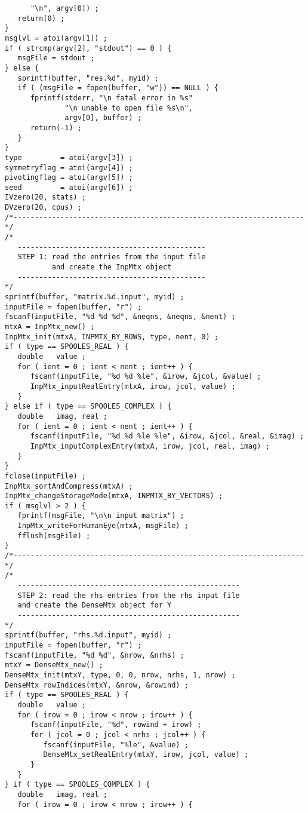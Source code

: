 \begin{verbatim}
      "\n", argv[0]) ;
   return(0) ;
}
msglvl = atoi(argv[1]) ;
if ( strcmp(argv[2], "stdout") == 0 ) {
   msgFile = stdout ;
} else {
   sprintf(buffer, "res.%d", myid) ;
   if ( (msgFile = fopen(buffer, "w")) == NULL ) {
      fprintf(stderr, "\n fatal error in %s"
              "\n unable to open file %s\n",
              argv[0], buffer) ;
      return(-1) ;
   }
}
type         = atoi(argv[3]) ;
symmetryflag = atoi(argv[4]) ;
pivotingflag = atoi(argv[5]) ;
seed         = atoi(argv[6]) ;
IVzero(20, stats) ;
DVzero(20, cpus) ;
/*--------------------------------------------------------------------*/
/*
   --------------------------------------------
   STEP 1: read the entries from the input file 
           and create the InpMtx object
   --------------------------------------------
*/
sprintf(buffer, "matrix.%d.input", myid) ;
inputFile = fopen(buffer, "r") ;
fscanf(inputFile, "%d %d %d", &neqns, &neqns, &nent) ;
mtxA = InpMtx_new() ;
InpMtx_init(mtxA, INPMTX_BY_ROWS, type, nent, 0) ;
if ( type == SPOOLES_REAL ) {
   double   value ;
   for ( ient = 0 ; ient < nent ; ient++ ) {
      fscanf(inputFile, "%d %d %le", &irow, &jcol, &value) ;
      InpMtx_inputRealEntry(mtxA, irow, jcol, value) ;
   }
} else if ( type == SPOOLES_COMPLEX ) {
   double   imag, real ;
   for ( ient = 0 ; ient < nent ; ient++ ) {
      fscanf(inputFile, "%d %d %le %le", &irow, &jcol, &real, &imag) ;
      InpMtx_inputComplexEntry(mtxA, irow, jcol, real, imag) ;
   }
}
fclose(inputFile) ;
InpMtx_sortAndCompress(mtxA) ;
InpMtx_changeStorageMode(mtxA, INPMTX_BY_VECTORS) ;
if ( msglvl > 2 ) {
   fprintf(msgFile, "\n\n input matrix") ;
   InpMtx_writeForHumanEye(mtxA, msgFile) ;
   fflush(msgFile) ;
}
/*--------------------------------------------------------------------*/
/*
   ----------------------------------------------------
   STEP 2: read the rhs entries from the rhs input file 
   and create the DenseMtx object for Y
   ----------------------------------------------------
*/
sprintf(buffer, "rhs.%d.input", myid) ;
inputFile = fopen(buffer, "r") ;
fscanf(inputFile, "%d %d", &nrow, &nrhs) ;
mtxY = DenseMtx_new() ;
DenseMtx_init(mtxY, type, 0, 0, nrow, nrhs, 1, nrow) ;
DenseMtx_rowIndices(mtxY, &nrow, &rowind) ;
if ( type == SPOOLES_REAL ) {
   double   value ;
   for ( irow = 0 ; irow < nrow ; irow++ ) {
      fscanf(inputFile, "%d", rowind + irow) ;
      for ( jcol = 0 ; jcol < nrhs ; jcol++ ) {
         fscanf(inputFile, "%le", &value) ;
         DenseMtx_setRealEntry(mtxY, irow, jcol, value) ;
      }
   }
} if ( type == SPOOLES_COMPLEX ) {
   double   imag, real ;
   for ( irow = 0 ; irow < nrow ; irow++ ) {

\end{verbatim}
